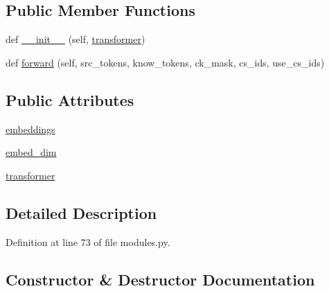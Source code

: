\subsection*{Public Member Functions}
\begin{DoxyCompactItemize}
\item 
def \hyperlink{classprojects_1_1wizard__of__wikipedia_1_1generator_1_1modules_1_1ContextKnowledgeEncoder_a30bdd85c8d48f70f1c903e0832f618f8}{\+\_\+\+\_\+init\+\_\+\+\_\+} (self, \hyperlink{classprojects_1_1wizard__of__wikipedia_1_1generator_1_1modules_1_1ContextKnowledgeEncoder_aaf8e62c67b68634bd0e3ea1be88b7a6c}{transformer})
\item 
def \hyperlink{classprojects_1_1wizard__of__wikipedia_1_1generator_1_1modules_1_1ContextKnowledgeEncoder_a482a0f0798408978ba2902159517d84b}{forward} (self, src\+\_\+tokens, know\+\_\+tokens, ck\+\_\+mask, cs\+\_\+ids, use\+\_\+cs\+\_\+ids)
\end{DoxyCompactItemize}
\subsection*{Public Attributes}
\begin{DoxyCompactItemize}
\item 
\hyperlink{classprojects_1_1wizard__of__wikipedia_1_1generator_1_1modules_1_1ContextKnowledgeEncoder_aa1c8bdeb31ac36e8ce13856fb6c47006}{embeddings}
\item 
\hyperlink{classprojects_1_1wizard__of__wikipedia_1_1generator_1_1modules_1_1ContextKnowledgeEncoder_af06900dbcf4bcd72ed923dbe8930b0e0}{embed\+\_\+dim}
\item 
\hyperlink{classprojects_1_1wizard__of__wikipedia_1_1generator_1_1modules_1_1ContextKnowledgeEncoder_aaf8e62c67b68634bd0e3ea1be88b7a6c}{transformer}
\end{DoxyCompactItemize}


\subsection{Detailed Description}


Definition at line 73 of file modules.\+py.



\subsection{Constructor \& Destructor Documentation}
\mbox{\label{classprojects_1_1wizard__of__wikipedia_1_1generator_1_1modules_1_1ContextKnowledgeEncoder_a30bdd85c8d48f70f1c903e0832f618f8}} 
